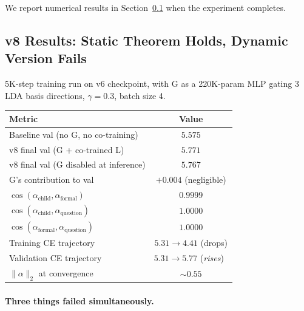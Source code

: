 \documentclass[11pt, a4paper]{article}
\theoremstyle{plain}
\theoremstyle{definition}
\theoremstyle{remark}
\begin{document}
We report numerical results in Section~\ref{sec:v8-results} when the experiment completes.

\subsection{v8 Results: Static Theorem Holds, Dynamic Version Fails}
\label{sec:v8-results}

5K-step training run on v6 checkpoint, with G as a 220K-param MLP gating 3 LDA basis directions, $\gamma = 0.3$, batch size 4.

\begin{center}
\begin{tabular}{l c}
\toprule
Metric & Value \\
\midrule
Baseline val (no G, no co-training) & $5.575$ \\
v8 final val (G + co-trained L) & $5.771$ \\
v8 final val (G disabled at inference) & $5.767$ \\
G's contribution to val & $+0.004$ (negligible) \\
\midrule
$\cos(\alpha_{\text{child}}, \alpha_{\text{formal}})$    & $0.9999$ \\
$\cos(\alpha_{\text{child}}, \alpha_{\text{question}})$  & $1.0000$ \\
$\cos(\alpha_{\text{formal}}, \alpha_{\text{question}})$ & $1.0000$ \\
\midrule
Training CE trajectory & $5.31 \to 4.41$ (drops) \\
Validation CE trajectory & $5.31 \to 5.77$ (\emph{rises})~ \\
$\|\alpha\|_2$ at convergence & $\sim 0.55$ \\
\bottomrule
\end{tabular}
\end{center}

\paragraph{Three things failed simultaneously.}
\end{document}

